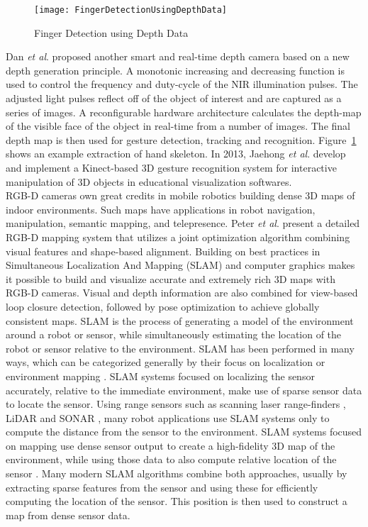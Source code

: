 %
\begin{figure}[b]
\centering
\texttt{[image: FingerDetectionUsingDepthData]}
\caption{Finger Detection using Depth Data \cite{NIRGesture14}}
\label{FingerDetectionUsingDepthData}
\end{figure}%
Dan \textit{et al}. \cite{NIRGesture14} proposed another smart and real-time depth camera based on a new depth generation principle. A monotonic increasing and decreasing function is used to control the frequency and duty-cycle of the NIR illumination pulses. The adjusted light pulses reflect off of the object of interest and are captured as a series of images. A reconfigurable hardware architecture calculates the depth-map of the visible face of the object in real-time from a number of images. The final depth map is then used for gesture detection, tracking and recognition. Figure~\ref{FingerDetectionUsingDepthData} shows an example extraction of hand skeleton. In 2013, Jaehong \textit{et al}. \cite{InteractiveManipulation_2013} develop and implement a Kinect-based 3D gesture recognition system for interactive
manipulation of 3D objects in educational visualization softwares. 
\\\indent%
%
RGB-D cameras own great credits in mobile robotics building dense 3D maps of indoor environments. Such maps have applications in robot navigation, manipulation, semantic mapping, and telepresence. Peter \textit{et al}. \cite{indorMappingRGBD_2014} present a detailed RGB-D mapping system that utilizes a joint optimization algorithm combining visual features and shape-based alignment. Building on best practices in Simultaneous Localization And Mapping (SLAM) and computer graphics makes it possible to build and visualize accurate and extremely rich 3D maps with RGB-D cameras. Visual and depth information are also combined for view-based loop closure detection, followed by pose optimization to achieve globally consistent maps. SLAM is the process of generating a model of the environment around a robot or sensor, while simultaneously estimating the location of the robot or sensor relative to the environment. SLAM has been performed in many ways, which can be categorized generally by their focus on localization or environment mapping \cite{SLAMintro_2015}. SLAM systems focused on localizing the sensor accurately, relative to the immediate environment, make use of sparse sensor data to locate the sensor. Using range sensors such as scanning laser range-finders \cite{laserSLAM_2011}, LiDAR and SONAR \cite{sonarSLAM_2013}, many robot applications use SLAM systems only to compute the distance from the sensor to the environment. SLAM systems focused on mapping use dense sensor output to create a high-fidelity 3D map of the environment, while using those data to also compute relative location of the sensor \cite{KinectFusion_2011, mapSLAM_2013}. Many modern SLAM algorithms combine both approaches, usually by extracting sparse features from the sensor and using these for efficiently computing the location of the sensor. This position is then used to construct a map from dense sensor data. 
